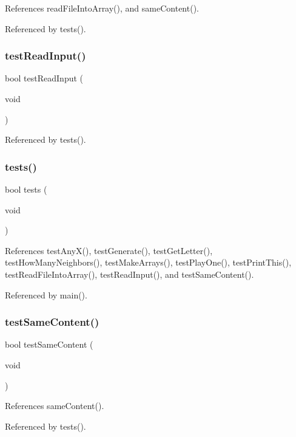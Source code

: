 References read\+File\+Into\+Array(), and same\+Content().



Referenced by tests().

\mbox{\label{tests_8h_aa89f64db87aebe77bd891e2894595e4e}} 
\subsubsection{test\+Read\+Input()}
{\footnotesize\ttfamily bool test\+Read\+Input (\begin{DoxyParamCaption}\item[{void}]{ }\end{DoxyParamCaption})}



Referenced by tests().

\mbox{\label{tests_8h_a5e6e6e78df62797046c9ea173550a68a}} 
\subsubsection{tests()}
{\footnotesize\ttfamily bool tests (\begin{DoxyParamCaption}\item[{void}]{ }\end{DoxyParamCaption})}



References test\+Any\+X(), test\+Generate(), test\+Get\+Letter(), test\+How\+Many\+Neighbors(), test\+Make\+Arrays(), test\+Play\+One(), test\+Print\+This(), test\+Read\+File\+Into\+Array(), test\+Read\+Input(), and test\+Same\+Content().



Referenced by main().

\mbox{\label{tests_8h_a7017056d6783f53023d1f1f0336d3d3e}} 
\subsubsection{test\+Same\+Content()}
{\footnotesize\ttfamily bool test\+Same\+Content (\begin{DoxyParamCaption}\item[{void}]{ }\end{DoxyParamCaption})}



References same\+Content().



Referenced by tests().

